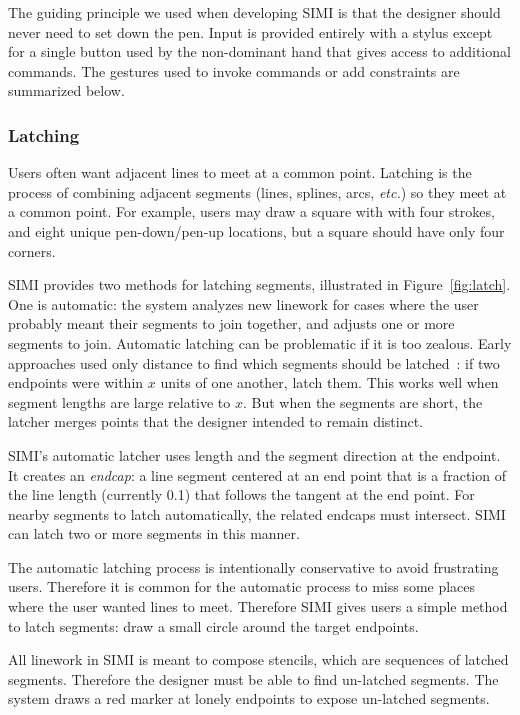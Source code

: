 \documentclass{article}
\begin{document}

The guiding principle we used when developing SIMI is that the
designer should never need to set down the pen. Input is provided
entirely with a stylus except for a single button used by the
non-dominant hand that gives access to additional commands. The
gestures used to invoke commands or add constraints are summarized
below.

\subsubsection{Latching}

Users often want adjacent lines to meet at a common point. Latching is
the process of combining adjacent segments (lines, splines, arcs,
\textit{etc.}) so they meet at a common point. For example, users may
draw a square with with four strokes, and eight unique pen-down/pen-up
locations, but a square should have only four corners.

SIMI provides two methods for latching segments, illustrated in
Figure~\ref{fig:latch}. One is automatic: the system analyzes new
linework for cases where the user probably meant their segments to
join together, and adjusts one or more segments to join. Automatic
latching can be problematic if it is too zealous. Early approaches
used only distance to find which segments should be
latched~\cite{herot-latch-corners}: if two endpoints were within $x$
units of one another, latch them. This works well when segment lengths
are large relative to $x$. But when the segments are short, the
latcher merges points that the designer intended to remain distinct.

SIMI's automatic latcher uses length and the segment direction at the
endpoint. It creates an \textit{endcap}: a line segment centered at an
end point that is a fraction of the line length (currently 0.1) that
follows the tangent at the end point. For nearby segments to latch
automatically, the related endcaps must intersect. SIMI can latch two
or more segments in this manner.

The automatic latching process is intentionally conservative to avoid
frustrating users. Therefore it is common for the automatic process to
miss some places where the user wanted lines to meet. Therefore SIMI
gives users a simple method to latch segments: draw a small circle
around the target endpoints.

All linework in SIMI is meant to compose stencils, which are sequences
of latched segments. Therefore the designer must be able to find
un-latched segments. The system draws a red marker at lonely endpoints
to expose un-latched segments.
\end{document}
